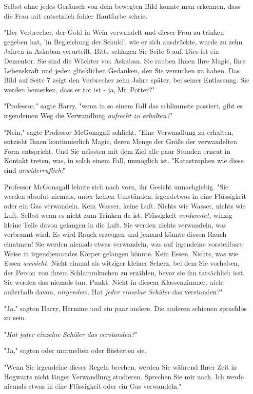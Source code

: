 {Selbst ohne jedes Geräusch von dem bewegten Bild konnte man erkennen, dass die Frau mit entsetzlich fahler Hautfarbe schrie.

"Der Verbrecher, der Gold in Wein verwandelt und dieser Frau zu trinken gegeben hat, 'in Begleichung der Schuld', wie er sich ausdrückte, wurde zu zehn Jahren in Askaban verurteilt. Bitte schlagen Sie Seite 6 auf. Dies ist ein Dementor. Sie sind die Wächter von Askaban. Sie rauben Ihnen Ihre Magie, Ihre Lebenskraft und jeden glücklichen Gedanken, den Sie versuchen zu haben. Das Bild auf Seite 7 zeigt den Verbrecher zehn Jahre später, bei seiner Entlassung. Sie werden bemerken, dass er tot ist - ja, Mr~Potter?"

"Professor," sagte Harry, "wenn in so einem Fall das schlimmste passiert, gibt es irgendeinen Weg die Verwandlung \emph{aufrecht zu erhalten?}"

"Nein," sagte Professor McGonagall schlicht. "Eine Verwandlung zu erhalten, entzieht Ihnen kontinuierlich Magie, deren Menge der Größe der verwandelten Form entspricht. Und Sie müssten mit dem Ziel alle paar Stunden erneut in Kontakt treten, was, in solch einem Fall, unmöglich ist. "Katastrophen wie diese sind \emph{unwiderruflich!}"

Professor McGonagall lehnte sich nach vorn, ihr Gesicht unnachgiebig. "Sie werden absolut niemals, unter keinen Umständen, irgendetwas in eine Flüssigkeit oder ein Gas verwandeln. Kein Wasser, keine Luft. Nichts wie Wasser, nichts wie Luft. Selbst wenn es nicht zum Trinken da ist. Flüssigkeit \emph{verdunstet,} winzig kleine Teile davon gelangen in die Luft. Sie werden nichts verwandeln, was verbrannt wird. Es wird Rauch erzeugen und jemand könnte diesen Rauch einatmen! Sie werden niemals etwas verwandeln, was auf irgendeine vorstellbare Weise in irgendjemandes Körper gelangen könnte. Kein Essen. Nichts, was wie Essen \emph{aussieht.} Nicht einmal als witziger kleiner Scherz, bei dem Sie vorhaben, der Person von ihrem Schlammkuchen zu erzählen, bevor sie ihn tatsächlich isst. Sie werden das niemals tun. Punkt. Nicht in diesem Klassenzimmer, nicht außerhalb davon, \emph{nirgendwo.} Hat \emph{jeder einzelne Schüler} das verstanden?"

"Ja," sagten Harry, Hermine und ein paar andere. Die anderen schienen sprachlos zu sein.

"\emph{Hat jeder einzelne Schüler das verstanden?}"

"Ja," sagten oder murmelten oder flüsterten sie.

"Wenn Sie irgendeine dieser Regeln brechen, werden Sie während Ihrer Zeit in Hogwarts nicht länger Verwandlung studieren. Sprechen Sie mir nach. Ich werde niemals etwas in eine Flüssigkeit oder ein Gas verwandeln."

}
